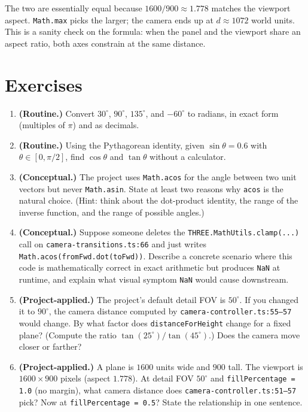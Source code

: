 \documentclass{article}
\begin{document}
The two are essentially equal because $1600/900 \approx 1.778$ matches the
viewport aspect. \lstinline{Math.max} picks the larger; the camera ends up at
$d \approx 1072$ world units. This is a sanity check on the formula: when the
panel and the viewport share an aspect ratio, both axes constrain at the same
distance.

\section{Exercises}

\begin{enumerate}
  \item \textbf{(Routine.)} Convert $30^\circ$, $90^\circ$, $135^\circ$, and
    $-60^\circ$ to radians, in exact form (multiples of $\pi$) and as decimals.

  \item \textbf{(Routine.)} Using the Pythagorean identity, given
    $\sin\theta = 0.6$ with $\theta \in [0, \pi/2]$, find $\cos\theta$ and
    $\tan\theta$ without a calculator.

  \item \textbf{(Conceptual.)} The project uses \lstinline{Math.acos} for the
    angle between two unit vectors but never \lstinline{Math.asin}. State at
    least two reasons why \lstinline{acos} is the natural choice. (Hint: think
    about the dot-product identity, the range of the inverse function, and the
    range of possible angles.)

  \item \textbf{(Conceptual.)} Suppose someone deletes the
    \lstinline{THREE.MathUtils.clamp(...)} call on
    \texttt{camera-transitions.ts:66} and just writes
    \lstinline{Math.acos(fromFwd.dot(toFwd))}. Describe a concrete scenario
    where this code is mathematically correct in exact arithmetic but produces
    \lstinline{NaN} at runtime, and explain what visual symptom \lstinline{NaN}
    would cause downstream.

  \item \textbf{(Project-applied.)} The project's default detail FOV is
    $50^\circ$. If you changed it to $90^\circ$, the camera distance computed
    by \texttt{camera-controller.ts:55--57} would change. By what factor does
    \lstinline{distanceForHeight} change for a fixed plane? (Compute the ratio
    $\tan(25^\circ) / \tan(45^\circ)$.) Does the camera move closer or farther?

  \item \textbf{(Project-applied.)} A plane is $1600$ units wide and $900$
    tall. The viewport is $1600 \times 900$ pixels (aspect $1.778$). At
    detail FOV $50^\circ$ and \lstinline{fillPercentage = 1.0} (no margin),
    what camera distance does \texttt{camera-controller.ts:51--57} pick? Now
    at \lstinline{fillPercentage = 0.5}? State the relationship in one
    sentence.


\end{enumerate}
\end{document}
